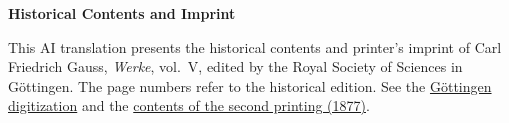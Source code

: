 \clearpage
{}
\begin{center}\textbf{Historical Contents and Imprint}\end{center}
\noindent This AI translation presents the historical contents and printer’s imprint of Carl Friedrich Gauss, \textit{Werke}, vol.~V, edited by the Royal Society of Sciences in Göttingen. The page numbers refer to the historical edition. See the \href{https://gdz.sub.uni-goettingen.de/id/PPN236006339}{Göttingen digitization} and the \href{https://archive.org/download/Werkecarlf05gausrich/page/n652}{contents of the second printing (1877)}.
\par\medskip
